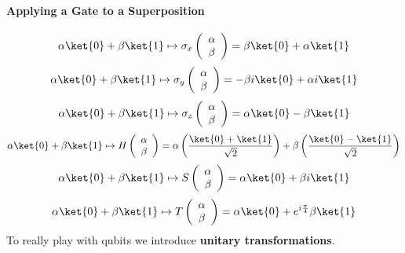 \documentclass[10pt]{report}
\begin{document}
\paragraph{Applying a Gate to a Superposition}
$$\alpha\ket{0} + \beta\ket{1} \mapsto \sigma_x\left(\begin{array}{c}
\alpha\\\beta
\end{array}\right) = \beta\ket{0} + \alpha\ket{1}$$
$$\alpha\ket{0} + \beta\ket{1} \mapsto \sigma_y\left(\begin{array}{c}
\alpha\\\beta
\end{array}\right) = -\beta i\ket{0} + \alpha i\ket{1}$$
$$\alpha\ket{0} + \beta\ket{1} \mapsto \sigma_z\left(\begin{array}{c}
\alpha\\\beta
\end{array}\right) = \alpha\ket{0} - \beta\ket{1}$$
$$\alpha\ket{0} + \beta\ket{1} \mapsto H\left(\begin{array}{c}
\alpha\\\beta
\end{array}\right) = \alpha\left(\frac{\ket{0} + \ket{1}}{\sqrt{2}}\right) + \beta\left(\frac{\ket{0} - \ket{1}}{\sqrt{2}}\right)$$
$$\alpha\ket{0} + \beta\ket{1} \mapsto S\left(\begin{array}{c}
\alpha\\\beta
\end{array}\right) = \alpha\ket{0} + \beta i\ket{1}$$
$$\alpha\ket{0} + \beta\ket{1} \mapsto T\left(\begin{array}{c}
\alpha\\\beta
\end{array}\right) = \alpha\ket{0} + e^{i\frac{\pi}{4}}\beta\ket{1}$$
To really play with qubits we introduce \textbf{unitary transformations}.
\end{document}
